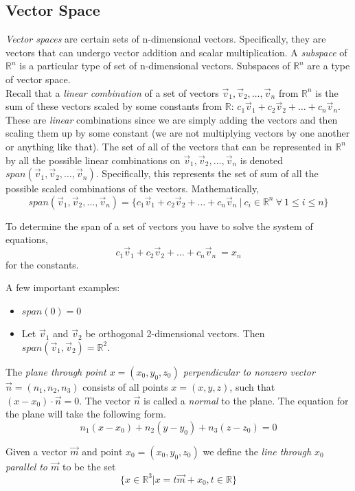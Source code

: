 \documentclass[12pt]{article}
\begin{document}
\subsection{Vector Space}
\emph{Vector spaces} are certain sets of n-dimensional vectors. Specifically, they are vectors that can undergo vector addition and scalar multiplication. A \emph{subspace} of $\mathbb{R}^n$ is a particular type of set of n-dimensional vectors. Subspaces of $\mathbb{R}^n$ are a type of vector space. \\

Recall that a \emph{linear combination} of a set of vectors $\vec{v}_1,\vec{v}_2,\ldots,\vec{v}_n$ from $\mathbb{R}^n$ is the sum of these vectors scaled by some constants from $\mathbb{R}$: $c_1\vec{v}_1+c_2\vec{v}_2+\ldots+c_n\vec{v}_n$. These are \emph{linear} combinations since we are simply adding the vectors and then scaling them up by some constant (we are not multiplying vectors by one another or anything like that). The set of all of the vectors that can be represented in $\mathbb{R}^n$ by all the possible linear combinations on $\vec{v}_1,\vec{v}_2,\ldots,\vec{v}_n$ is denoted $span(\vec{v}_1,\vec{v}_2,\ldots,\vec{v}_n)$. Specifically, this represents the set of sum of all the possible scaled combinations of the vectors. Mathematically,
\[
span(\vec{v}_1,\vec{v}_2,\ldots,\vec{v}_n) = \{ c_1\vec{v}_1+c_2\vec{v}_2+\ldots+c_n\vec{v}_n\ |\ c_i \in \mathbb{R}^n\ \forall\ 1 \leq i \leq n \}
\]

To determine the span of a set of vectors you have to solve the system of equations,
\[
c_1\vec{v}_1+c_2\vec{v}_2+\ldots+c_n\vec{v}_n\ = x_n
\]
for the constants.

A few important examples:
\begin{itemize}
\item $span(0)=0$
\item Let $\vec{v}_1$ and $\vec{v}_2$ be orthogonal 2-dimensional vectors. Then $span(\vec{v}_1,\vec{v}_2)=\mathbb{R}^2$.\\
\end{itemize} 

The \emph{plane through point $x = (x_0,y_0,z_0)$ perpendicular to nonzero vector $\vec{n}=(n_1,n_2, n_3)$} consists of all points $x=(x,y,z)$, such that $(x-x_0)\cdot \vec{n} = 0$. The vector $\vec{n}$ is called a \emph{normal} to the plane.  The equation for the plane will take the following form.
\[
n_1(x-x_0)+n_2(y-y_0)+n_3(z-z_0)=0
\]

Given a vector $\vec{m}$ and point $x_0=(x_0,y_0,z_0)$ we define the \emph{line through $x_0$ parallel to $\vec{m}$} to be the set
\[
\{x\in\mathbb{R}^3|x=t\vec{m}+x_0, t\in\mathbb{R}\}
\]
\end{document}
